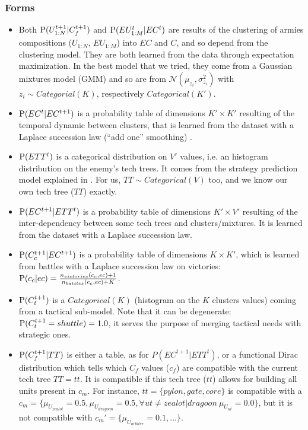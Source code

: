\subsubsection{Forms}
\begin{itemize}
\item Both $\mathrm{P}(U_{1:N}^{t+1}|C_f^{t+1})$ and $\mathrm{P}(EU_{1:M}^t|EC^t)$ are results of the clustering of armies compositions ($U_{1:N}$, $EU_{1:M}$) into $EC$ and $C$, and so depend from the clustering model. They are both learned from the data through expectation maximization. In the best model that we tried, they come from a Gaussian mixtures model (GMM) and so are from $\mathcal{N}(\mu_{z_i}, \sigma^2_{z_i})$ with $z_i \sim Categorial(K)$, respectively $Categorical(K')$. %

\item $\mathrm{P}(EC^t|EC^{t+1})$ is a probability table of dimensions $K' \times K'$ resulting of the temporal dynamic between clusters, that is learned from the dataset with a Laplace succession law (``add one'' smoothing) \cite{Jaynes}.

\item $\mathrm{P}(ETT^t)$ is a categorical distribution on $V'$ values, i.e. an histogram distribution on the enemy's tech trees. It comes from the strategy prediction model explained in \cite{SYNNAEVE:StratPred}. For us, $TT \sim Categorical(V)$ too, and we know our own tech tree ($TT$) exactly.

\item $\mathrm{P}(EC^{t+1}|ETT^t)$ is a probability table of dimensions $K' \times V'$ resulting of the inter-dependency between some tech trees and clusters/mixtures. It is learned from the dataset with a Laplace succession law.

\item $\mathrm{P}(C_c^{t+1}|EC^{t+1})$ is a probability table of dimensions $K \times K'$, which is learned from battles with a Laplace succession law on victories: $\mathrm{P}(c_c|ec) = \frac{n_{victories}(c_c, ec)+1}{n_{battles}(c_c, ec)+K}$.

\item $\mathrm{P}(C_t^{t+1})$ is a $Categorical(K)$ (histogram on the $K$ clusters values) coming from a tactical sub-model. Note that it can be degenerate: $\mathrm{P}(C_t^{t+1}=shuttle)=1.0$, it serves the purpose of merging tactical needs with strategic ones.

\item $\mathrm{P}(C_f^{t+1}|TT)$ is either a table, as for $P(EC^{t+1}|ETT^t)$, or a functional Dirac distribution which tells which $C_f$ values ($c_f$) are compatible with the current tech tree $TT=tt$. It is compatible if this tech tree ($tt$) allows for building all units present in $c_m$. For instance, $tt=\{pylon, gate, core\}$ is compatible with a $c_m=\{\mu_{U_{zealot}}=0.5, \mu_{U_{dragoon}}=0.5, \forall ut \neq zealot|dragoon\ \mu_{U_{ut}}=0.0\}$, but it is not compatible with $c_m'=\{\mu_{U_{arbiter}}=0.1, \dots\}$.


\end{itemize}
